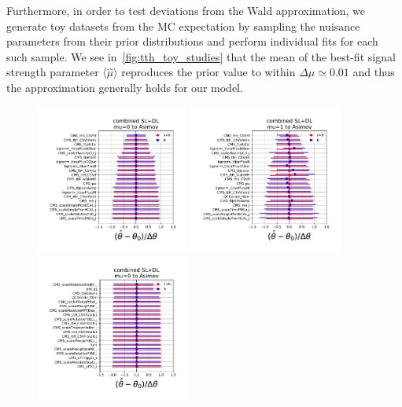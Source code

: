 Furthermore, in order to test deviations from the Wald approximation, we generate toy datasets from the MC expectation by sampling the nuisance parameters from their prior distributions and perform individual fits for each such sample. We see in~\cref{fig:tth_toy_studies} that the mean of the best-fit signal strength parameter $\langle \hat{\mu} \rangle$ reproduces the prior value to within $\Delta\mu \simeq 0.01$ and thus the approximation generally holds for our model. 

\begin{figure}
\setlength{\floatsep}{1pt}
\begin{centering}
\includegraphics[width=0.45\textwidth]{figures/tth/pulls_group_sldl_sig0_r0_20_asimov.pdf}
\includegraphics[width=0.45\textwidth]{figures/tth/pulls_group_sldl_sig1_r0_20_asimov.pdf}\\
\includegraphics[width=0.45\textwidth]{figures/tth/pulls_group_sldl_sig0_r20_40_asimov.pdf}

\end{centering}
\end{figure}
